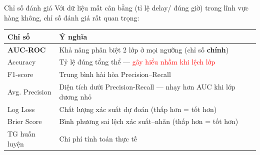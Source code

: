 \begin{frame}{Chỉ số đánh giá}
Với dữ liệu mất cân bằng (tỉ lệ delay/ đúng giờ) trong lĩnh vực hàng không, chỉ số đánh giá rất quan trọng:

\vspace{2mm}
\small
\begin{table}
\centering
\slideTablePad
\begin{tabular}{|l|p{7.5cm}|}
\hline
\textbf{Chỉ số} & \textbf{Ý nghĩa} \\
\hline
\textbf{AUC-ROC} & Khả năng phân biệt 2 lớp ở mọi ngưỡng (chỉ số \textbf{chính}) \\
\hline
Accuracy & Tỷ lệ đúng tổng thể --- \textcolor{red}{gây hiểu nhầm khi lệch lớp} \\
\hline
F1-score & Trung bình hài hòa Precision--Recall \\
\hline
Avg. Precision & Diện tích dưới Precision-Recall --- nhạy hơn AUC khi lớp dương nhỏ \\
\hline
Log Loss & Chất lượng xác suất dự đoán (thấp hơn = tốt hơn) \\
\hline
Brier Score & Bình phương sai lệch xác suất--nhãn (thấp hơn = tốt hơn) \\
\hline
TG huấn luyện & Chi phí tính toán thực tế \\
\hline
\end{tabular}
\end{table}

\end{frame}
